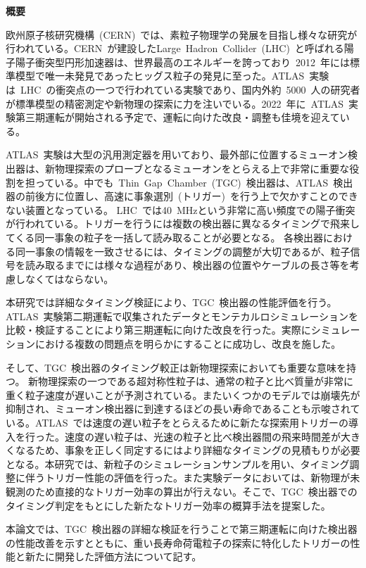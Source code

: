 \begin{center}
    \textbf{概要}
\end{center}
\thispagestyle{empty}
\vspace{10pt}
欧州原子核研究機構~(CERN)~では、素粒子物理学の発展を目指し様々な研究が行われている。CERN~が建設したLarge~Hadron~Collider~(LHC)~と呼ばれる陽子陽子衝突型円形加速器は、世界最高のエネルギーを誇っており~2012~年には標準模型で唯一未発見であったヒッグス粒子の発見に至った。ATLAS~実験は~LHC~の衝突点の一つで行われている実験であり、国内外約~5000~人の研究者が標準模型の精密測定や新物理の探索に力を注いでいる。2022~年に~ATLAS~実験第三期運転が開始される予定で、運転に向けた改良・調整も佳境を迎えている。

ATLAS~実験は大型の汎用測定器を用いており、最外部に位置するミューオン検出器は、新物理探索のプローブとなるミューオンをとらえる上で非常に重要な役割を担っている。中でも~Thin~Gap~Chamber~(TGC)~検出器は、ATLAS~検出器の前後方に位置し、高速に事象選別~(トリガー)~を行う上で欠かすことのできない装置となっている。
LHC~では40~MHzという非常に高い頻度での陽子衝突が行われている。トリガーを行うには複数の検出器に異なるタイミングで飛来してくる同一事象の粒子を一括して読み取ることが必要となる。
各検出器における同一事象の情報を一致させるには、タイミングの調整が大切であるが、粒子信号を読み取るまでには様々な過程があり、検出器の位置やケーブルの長さ等を考慮しなくてはならない。

本研究では詳細なタイミング検証により、TGC~検出器の性能評価を行う。ATLAS~実験第二期運転で収集されたデータとモンテカルロシミュレーションを比較・検証することにより第三期運転に向けた改良を行った。実際にシミュレーションにおける複数の問題点を明らかにすることに成功し、改良を施した。

そして、TGC~検出器のタイミング較正は新物理探索においても重要な意味を持つ。
新物理探索の一つである超対称性粒子は、通常の粒子と比べ質量が非常に重く粒子速度が遅いことが予測されている。またいくつかのモデルでは崩壊先が抑制され、ミューオン検出器に到達するほどの長い寿命であることも示唆されている。ATLAS~では速度の遅い粒子をとらえるために新たな探索用トリガーの導入を行った。速度の遅い粒子は、光速の粒子と比べ検出器間の飛来時間差が大きくなるため、事象を正しく同定するにはより詳細なタイミングの見積もりが必要となる。本研究では、新粒子のシミュレーションサンプルを用い、タイミング調整に伴うトリガー性能の評価を行った。また実験データにおいては、新物理が未観測のため直接的なトリガー効率の算出が行えない。そこで、TGC~検出器でのタイミング判定をもとにした新たなトリガー効率の概算手法を提案した。

本論文では、TGC~検出器の詳細な検証を行うことで第三期運転に向けた検出器の性能改善を示すとともに、重い長寿命荷電粒子の探索に特化したトリガーの性能と新たに開発した評価方法について記す。